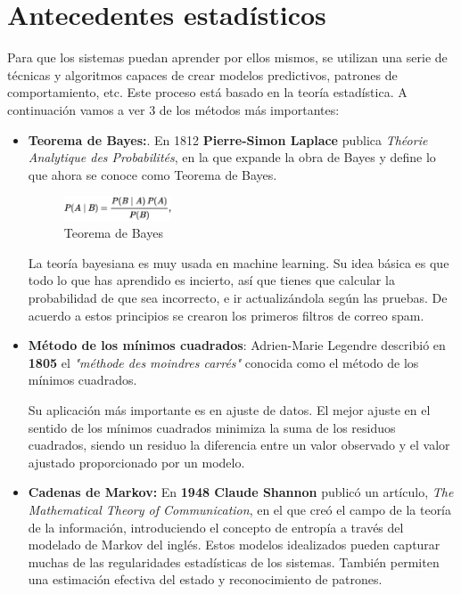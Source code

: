 \documentclass[a4paper, 11pt]{article} %
\begin{document}
\section{Antecedentes estadísticos}
Para que los sistemas puedan aprender por ellos mismos, se utilizan una serie de técnicas y algoritmos capaces de crear modelos predictivos, patrones de comportamiento, etc. Este proceso está basado en la teoría estadística. A continuación vamos a ver 3 de los métodos más importantes:
\begin{itemize}
	\item \textbf{Teorema de Bayes:}. En 1812 \textbf{Pierre-Simon Laplace} publica \emph{Théorie Analytique des Probabilités}, en la que expande la obra de Bayes y define lo que ahora se conoce como Teorema de Bayes.

	\begin{figure}[H]
		\centering
		\includegraphics[width=0.3\textwidth]{bayes.png}
		\caption{Teorema de Bayes}
		\label{Teorema de Bayes}
	\end{figure}

	La teoría bayesiana es muy usada en machine learning. Su idea básica es que todo lo que has aprendido es incierto, así que tienes que calcular la probabilidad de que sea incorrecto, e ir actualizándola según las pruebas. De acuerdo a estos principios se crearon los primeros filtros de correo spam.

	\item \textbf{Método de los mínimos cuadrados}: Adrien-Marie Legendre describió en \textbf{1805} el \emph{"méthode des moindres carrés"} conocida como el método de los mínimos cuadrados.

	Su aplicación más importante es en ajuste de datos. El mejor ajuste en el sentido de los mínimos cuadrados minimiza la suma de los residuos cuadrados, siendo un residuo la diferencia entre un valor observado y el valor ajustado proporcionado por un modelo.
	\item \textbf{Cadenas de Markov:} En \textbf{1948 Claude Shannon} publicó un artículo, \emph{The Mathematical Theory of Communication}, en el que creó el campo de la teoría de la información, introduciendo el concepto de entropía a través del modelado de Markov del inglés. Estos modelos idealizados pueden capturar muchas de las regularidades estadísticas de los sistemas. También permiten una estimación efectiva del estado y reconocimiento de patrones.

\end{itemize}
\end{document}
